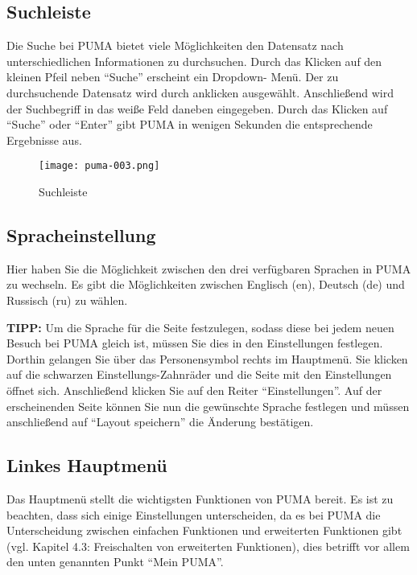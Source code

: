 \documentclass[b5paper,11pt,twoside]{scrbook} %
\begin{document}
\subsection{Suchleiste}
Die Suche bei PUMA bietet viele Möglichkeiten den Datensatz nach unterschiedlichen Informationen zu durchsuchen. Durch das Klicken auf den kleinen Pfeil neben \enquote{Suche} erscheint ein Dropdown- Menü.  Der zu durchsuchende Datensatz wird durch anklicken ausgewählt. Anschließend wird der Suchbegriff in das weiße Feld daneben eingegeben. Durch das Klicken auf \enquote{Suche} oder \enquote{Enter} gibt PUMA in wenigen Sekunden die entsprechende Ergebnisse aus.

\begin{figure}[ht]
 \centering
 \texttt{[image: puma-003.png]}
 \caption{Suchleiste}
 \label{figure3}
\end{figure}  

\subsection{Spracheinstellung}
Hier haben Sie die Möglichkeit zwischen den drei verfügbaren Sprachen in PUMA zu wechseln. Es gibt die Möglichkeiten zwischen Englisch (en), Deutsch (de) und Russisch (ru) zu wählen.
\newline
\begin{shaded}
\centering
\textbf{TIPP:} Um die Sprache für die Seite festzulegen, sodass diese bei jedem neuen Besuch bei PUMA gleich ist, müssen Sie dies in den Einstellungen festlegen. Dorthin gelangen Sie über das Personensymbol rechts im Hauptmenü. Sie klicken auf die schwarzen Einstellungs-Zahnräder und die Seite mit den Einstellungen öffnet sich. Anschließend klicken Sie auf den Reiter \enquote{Einstellungen}. Auf der erscheinenden Seite können Sie nun die gewünschte Sprache festlegen und müssen anschließend auf \enquote{Layout speichern} die Änderung bestätigen.
\end{shaded}
\subsection{Linkes Hauptmenü}
Das Hauptmenü stellt die wichtigsten Funktionen von PUMA bereit. Es ist zu beachten, dass sich einige Einstellungen unterscheiden, da es bei PUMA die Unterscheidung zwischen einfachen Funktionen und erweiterten Funktionen gibt (vgl. Kapitel 4.3: Freischalten von erweiterten Funktionen), dies betrifft vor allem den unten genannten Punkt \enquote{Mein PUMA}. 
\end{document}
